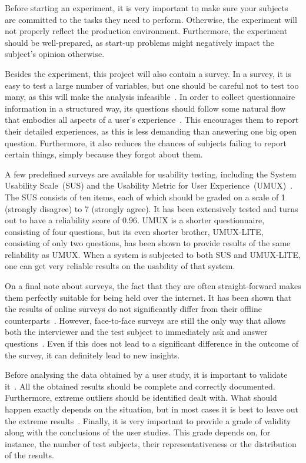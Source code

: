 Before starting an experiment, it is very important to make sure your subjects are committed to the tasks they need to perform. Otherwise, the experiment will not properly reflect the production environment. Furthermore, the experiment should be well-prepared, as start-up problems might negatively impact the subject's opinion otherwise.

Besides the experiment, this project will also contain a survey. In a survey, it is easy to test a large number of variables, but one should be careful not to test too many, as this will make the analysis infeasible~\cite{wohlin2003empirical}. In order to collect questionnaire information in a structured way, its questions should follow some natural flow that embodies all aspects of a user's experience~\cite{tuch2013analyzing}. This encourages them to report their detailed experiences, as this is less demanding than answering one big open question. Furthermore, it also reduces the chances of subjects failing to report certain things, simply because they forgot about them.

A few predefined surveys are available for usability testing, including the System Usability Scale~(SUS) and the Usability Metric for User Experience~(UMUX)~\cite{lewis2013umux}. The SUS consists of ten items, each of which should be graded on a scale of 1 (strongly disagree) to 7 (strongly agree). It has been extensively tested and turns out to have a reliability score of 0.96. UMUX is a shorter questionnaire, consisting of four questions, but its even shorter brother, UMUX-LITE, consisting of only two questions, has been shown to provide results of the same reliability as UMUX. When a system is subjected to both SUS and UMUX-LITE, one can get very reliable results on the usability of that system.

On a final note about surveys, the fact that they are often straight-forward makes them perfectly suitable for being held over the internet. It has been shown that the results of online surveys do not significantly differ from their offline counterparts~\cite{komarov2013crowdsourcing}. However, face-to-face surveys are still the only way that allows both the interviewer and the test subject to immediately ask and answer questions~\cite{wohlin2003empirical}. Even if this does not lead to a significant difference in the outcome of the survey, it can definitely lead to new insights.

Before analysing the data obtained by a user study, it is important to validate it~\cite{wohlin2003empirical}. All the obtained results should be complete and correctly documented. Furthermore, extreme outliers should be identified dealt with. What should happen exactly depends on the situation, but in most cases it is best to leave out the extreme results~\cite{komarov2013crowdsourcing}. Finally, it is very important to provide a grade of validity along with the conclusions of the user studies. This grade depends on, for instance, the number of test subjects, their representativeness or the distribution of the results.


